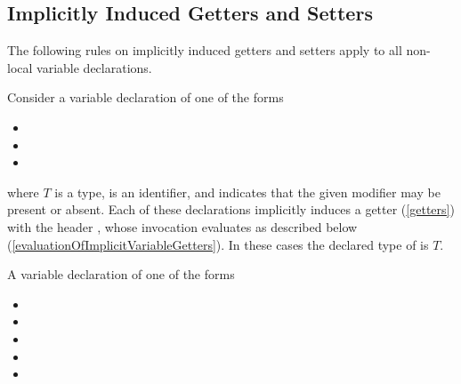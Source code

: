 \documentclass[makeidx]{article}
\begin{document}
\subsection{Implicitly Induced Getters and Setters}


\LMHash{}%
The following rules on implicitly induced getters and setters
apply to all non-local variable declarations.

\LMHash{}%
Consider a variable declaration of one of the forms

\begin{itemize}
\item {}
\item {}
\item {}
\end{itemize}

\noindent
where $T$ is a type, \id{} is an identifier,
and  indicates that the given modifier may be present or absent.
Each of these declarations implicitly induces a getter
(\ref{getters})
with the header ,
whose invocation evaluates as described below
(\ref{evaluationOfImplicitVariableGetters}).
In these cases the declared type of \id{} is $T$.
\EndCase

\LMHash{}%
A variable declaration of one of the forms

\begin{itemize}
\item {}
\item {}
\item {}
\item {}
\item {}
\end{itemize}
\end{document}
